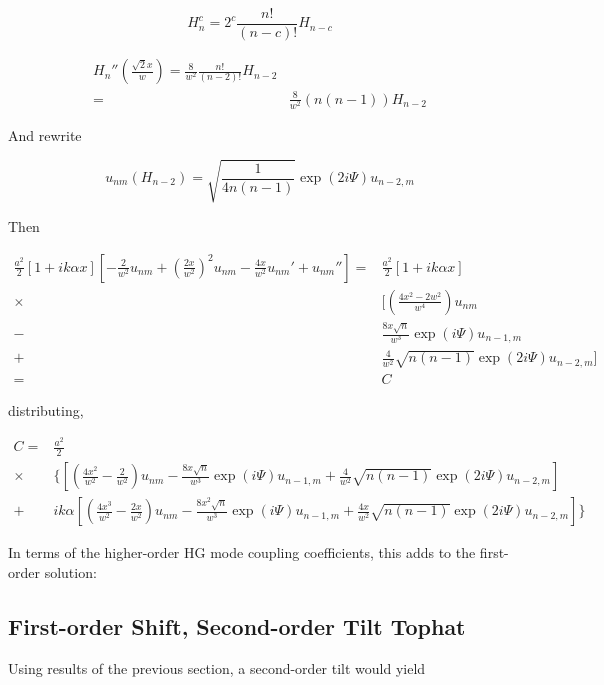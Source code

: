 \documentclass[aps,twoside,secnumarabic,balancelastpage,amsmath,amssymb,nofootinbib,hyperref=pdftex]{revtex4}
\begin{document}
\begin{equation}
	H_n^c= 2^c\frac{n!}{(n-c)!}H_{n-c}
\end{equation}

\begin{align*}
	H_n''(\frac{\sqrt{2}x}{w}) = 
	\frac{8}{w^2} \frac{n!}{(n-2)!}H_{n-2}
	\\=&
	\frac{8}{w^2} (n(n-1)) H_{n-2}
\end{align*}

And rewrite

\begin{equation*}
	u_{nm} (H_{n-2}) = \sqrt{\frac{1}{4 n(n-1)}}
		\exp(2i \Psi)
		u_{n-2,m}
\end{equation*}

Then

\begin{align*}
\frac{a^2}{2} [1+ik\alpha x] [-\frac{2}{w^2}u_{nm} + (\frac{2x}{w^2})^2 u_{nm} - \frac{4x}{w^2}u_{nm}' + u_{nm}'']
=&
\frac{a^2}{2} [1+ik\alpha x]
\\ \times&
[(\frac{4x^2-2w^2}{w^4}) u_{nm} 
\\-& \frac{8x \sqrt{n}}{w^3}
	\exp(i \Psi)
	u_{n-1,m}
\\+& 
	\frac{4}{w^2}
	\sqrt{n(n-1)}
		\exp(2i \Psi)
		u_{n-2,m}]
		\\=&
		C
\end{align*}

distributing,

\begin{align*}
C =&
\frac{a^2}{2} 
\\ \times&\{
[( \frac{4x^2}{w^2} -\frac{2}{w^2} )u_{nm} 
- \frac{8x \sqrt{n}}{w^3}
	\exp(i \Psi)
	u_{n-1,m}
+
	\frac{4}{w^2}
	\sqrt{n(n-1)}
		\exp(2i \Psi)
		u_{n-2,m}]
	\\+&
	ik \alpha
	[( \frac{4x^3}{w^2} -\frac{2x}{w^2} )u_{nm} 
- \frac{8x^2 \sqrt{n}}{w^3}
	\exp(i \Psi)
	u_{n-1,m}
+ 
	\frac{4x}{w^2}
	\sqrt{n(n-1)}
		\exp(2i \Psi)
		u_{n-2,m}]
		\}
\end{align*}

In terms of the higher-order HG mode coupling coefficients, this adds to the first-order solution:



\clearpage

\subsection{First-order Shift, Second-order Tilt Tophat}

Using results of the previous section, a second-order tilt would yield
\end{document}
